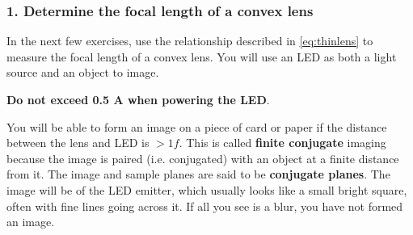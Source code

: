 \documentclass[a4paper]{report}
\begin{document}
\vspace{2.5em}



\clearpage




\subsubsection{1. Determine the focal length of a convex lens }
In the next few exercises, use the relationship described in \ref{eq:thinlens} to measure the focal length of a convex lens. You will use an LED as both a light source and an object to image. 
\vspace{1em}

\textbf{Do not exceed 0.5 A when powering the LED}.
\vspace{1em}

%




You will be able to form an image on a piece of card or paper if the distance between the lens and LED is $>1f$. This is called \textbf{finite conjugate} imaging because the image is paired (i.e. conjugated) with an object at a finite distance from it.
The image and sample planes are said to be \textbf{conjugate planes}.
The image will be of the LED emitter, which usually looks like a small bright square, often with fine lines going across it. 
If all you see is a blur, you have not formed an image.
\end{document}
